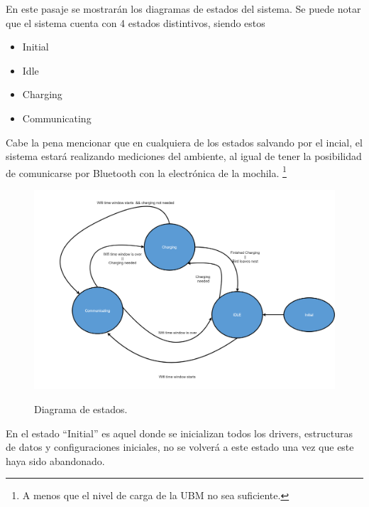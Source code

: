 En este pasaje se mostrarán los diagramas de estados del sistema.
Se puede notar que el sistema cuenta con 4 estados distintivos, siendo estos
\begin{itemize}
\item Initial
\item Idle
\item Charging
\item Communicating
\end{itemize}
Cabe la pena mencionar que en cualquiera de los estados salvando por el incial, el sistema estará realizando mediciones del ambiente, al igual de tener la posibilidad de comunicarse por Bluetooth con la electrónica de la mochila. \footnote{A menos que el nivel de carga de la UBM no sea suficiente.}

\begin{figure}[H]
	\centering
	\includegraphics[width=0.9\linewidth]{ImagenesIngenieria de Detalle/Diagrama_de_Estados}
	\label{fig:Diagrama_de_Estados}
	\caption{Diagrama de estados.}
\end{figure}

En el estado ``Initial'' es aquel donde se inicializan todos los drivers, estructuras de datos y configuraciones iniciales, no se volverá a este estado una vez que este haya sido abandonado. 

